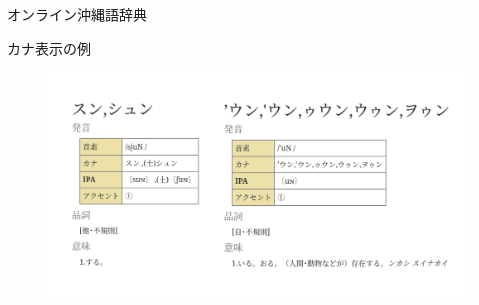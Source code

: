 \documentclass[14pt]{beamer}
\begin{document}
\begin{frame}{オンライン沖縄語辞典}
  \begin{block}{カナ表示の例}
    \begin{figure}[ht]
      \centering
        \includegraphics[height=0.6\paperheight,width=0.9\paperwidth]{okinawago-app-pronunciation-example2.png}
    \end{figure}
  \end{block}
\end{frame}


\end{document}
